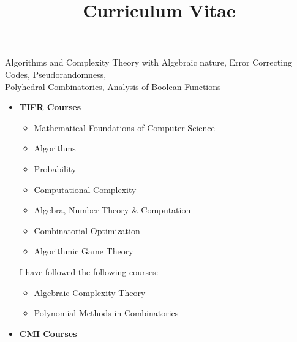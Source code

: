 \documentclass[a4paper,skipsamekey,11pt,english]{curve}
\title{Curriculum Vitae}
\begin{document}
\makeheaders[c]

Algorithms and Complexity Theory with Algebraic nature, Error Correcting Codes, Pseudorandomness, \\
Polyhedral Combinatorics, Analysis of Boolean Functions

% 
\begin{itemize}
	\item \textbf{TIFR Courses}
	      \begin{multicols}{2}
			\begin{itemize}
				\item Mathematical Foundations of Computer Science
				\item Algorithms
				\item Probability
				\item Computational Complexity
				\item Algebra, Number Theory \& Computation
				\item Combinatorial Optimization
				\item Algorithmic Game Theory
			\end{itemize}
		  \end{multicols}I have followed the following courses:
		 \begin{multicols}{2}
			\begin{itemize}
				\item Algebraic Complexity Theory
				\item Polynomial Methods in Combinatorics
			\end{itemize}
		 \end{multicols}
	\item \textbf{CMI Courses}


\end{itemize}
\end{document}
